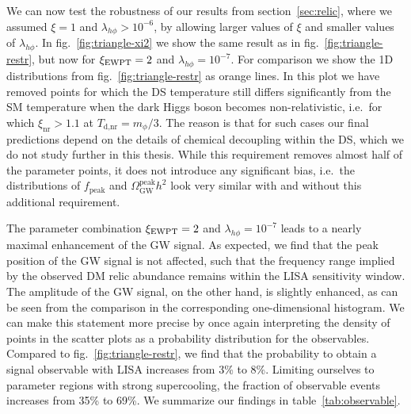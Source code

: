 We can now test the robustness of our results from section~\ref{sec:relic}, where we assumed $\xi = 1$ and $\lambda_{h\phi} > 10^{-6}$, by allowing larger values of $\xi$ and smaller values of $\lambda_{h\phi}$. In fig.~\ref{fig:triangle-xi2} we show the same result as in fig.~\ref{fig:triangle-restr}, but now for $\xi_{\text{EWPT}} = 2$ and $\lambda_{h\phi} = 10^{-7}$. For comparison we show the 1D distributions from fig.~\ref{fig:triangle-restr} as orange lines. In this plot we have removed points for which the \ac{DS} temperature still differs significantly from the \ac{SM} temperature when the dark Higgs boson becomes non-relativistic, i.e.~for which $\xi_\text{nr} > 1.1$ at $T_{\text{d,nr}} = m_\phi / 3$. The reason is that for such cases our final predictions depend on the details of chemical decoupling within the \ac{DS}, which we do not study further  in this thesis. While this requirement removes almost half of the parameter points, it does not introduce any significant bias, i.e.~the distributions of $f_\text{peak}$ and $\Omega_\text{GW}^\text{peak} h^2$ look very similar with and without this additional requirement.

The parameter combination $\xi_{\text{EWPT}} = 2$ and $\lambda_{h\phi} = 10^{-7}$ leads to a nearly maximal enhancement of the \ac{GW} signal. As expected, we find that the peak position of the \ac{GW} signal is not affected, such that the frequency range implied by the observed \ac{DM} relic abundance remains within the \ac{LISA} sensitivity window. The amplitude of the \ac{GW} signal, on the other hand, is slightly enhanced, as can be seen from the comparison in the corresponding one-dimensional histogram. We can make this statement more precise by once again interpreting the density of  points in the scatter plots as a probability  distribution for the observables. Compared to fig.~\ref{fig:triangle-restr}, we find that the probability to obtain a signal observable with \ac{LISA} increases from 3\% to 8\%. Limiting ourselves to parameter regions with strong supercooling, the fraction of observable events increases from 35\% to 69\%. We summarize our findings in table~\ref{tab:observable}.


